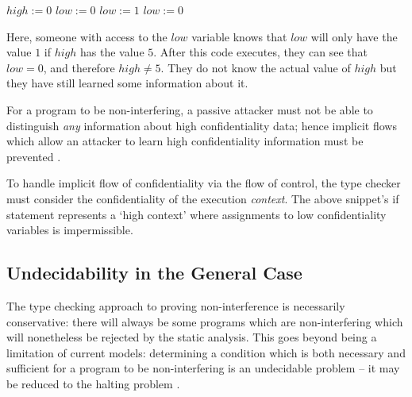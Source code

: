 \begin{algorithmic}
	\State $ high := 0 $
	\State $ low := 0 $
		\State $ low := 1 $
	\Else
		\State $ low := 0 $
	\EndIf
\end{algorithmic}

Here, someone with access to the $ low $ variable knows that $ low $ will only have the value $ 1 $ if $ high $ has the value $ 5 $. After this code executes, they can see that $ low = 0 $, and therefore $ high \ne 5 $. They do not know the actual value of $ high $ but they have still learned some information about it.

For a program to be non-interfering, a passive attacker must not be able to distinguish \textit{any} information about high confidentiality data; hence implicit flows which allow an attacker to learn high confidentiality information must be prevented \cite{sabelfeld2003if}.


To handle implicit flow of confidentiality via the flow of control, the type checker must consider the confidentiality of the execution \textit{context}. The above snippet's if statement represents a `high context' where assignments to low confidentiality variables is impermissible.

\subsection{Undecidability in the General Case}

The type checking approach to proving non-interference is necessarily conservative: there will always be some programs which are non-interfering which will nonetheless be rejected by the static analysis. This goes beyond being a limitation of current models: determining a condition which is both necessary and sufficient for a program to be non-interfering is an undecidable problem \cite{denning1977certification} \cite{landi1992undecidability} -- it may be reduced to the halting problem \cite{sabelfeld2003if}.

%


